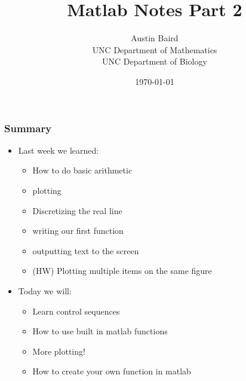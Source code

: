 \documentclass{beamer}
\title{ Matlab Notes Part 2}
\author{Austin Baird\\UNC Department of Mathematics\\UNC Department of Biology}
\date{\today}
\begin{document}
\frame{\titlepage}

\begin{frame}
\frametitle{Summary}
\begin{itemize}

\item Last week we learned: 
\begin{itemize}
\item How to do basic arithmetic
\item plotting 
\item Discretizing the real line
\item writing our first function 
\item outputting text to the screen 
\item (HW) Plotting multiple items on the same figure
\end{itemize}
\item Today we will: 
\begin{itemize}
\item Learn control sequences
\item How to use built in matlab functions
\item More plotting! 
\item How to create your own function in matlab
\end{itemize}
\end{itemize}

\end{frame}
\end{document}
